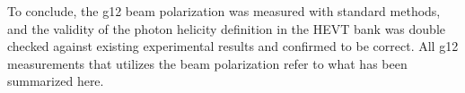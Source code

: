 To conclude, the g12 beam polarization was measured with standard methods, and the validity of the photon helicity definition in the HEVT bank was double checked against existing experimental results and confirmed to be correct. All g12 measurements that utilizes the beam polarization refer to what has been summarized here.


